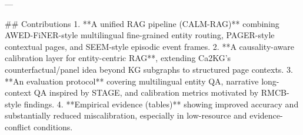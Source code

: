 ---

## Contributions  
1. **A unified RAG pipeline (CALM-RAG)** combining AWED-FiNER-style multilingual fine-grained entity routing, PAGER-style contextual pages, and SEEM-style episodic event frames.  
2. **A causality-aware calibration layer for entity-centric RAG**, extending Ca2KG’s counterfactual/panel idea beyond KG subgraphs to structured page contexts.  
3. **An evaluation protocol** covering multilingual entity QA, narrative long-context QA inspired by STAGE, and calibration metrics motivated by RMCB-style findings.  
4. **Empirical evidence (tables)** showing improved accuracy and substantially reduced miscalibration, especially in low-resource and evidence-conflict conditions.